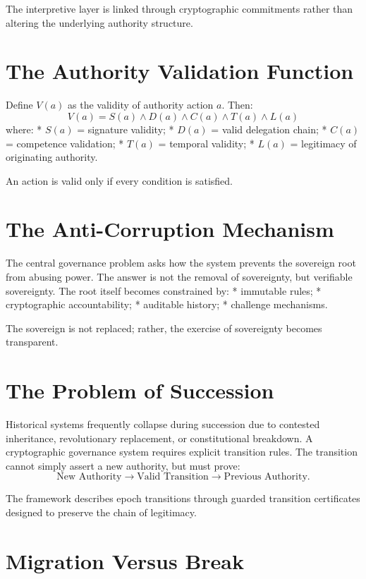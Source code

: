 \documentclass[11pt,openany]{book}
\theoremstyle{plain}
\theoremstyle{definition}
\begin{document}
The interpretive layer is linked through cryptographic commitments rather than altering the underlying authority structure.

\section*{The Authority Validation Function}

Define \(V(a)\) as the validity of authority action \(a\). Then:
\[
V(a) = S(a) \land D(a) \land C(a) \land T(a) \land L(a)
\]
where:
* \(S(a)\) = signature validity;
* \(D(a)\) = valid delegation chain;
* \(C(a)\) = competence validation;
* \(T(a)\) = temporal validity;
* \(L(a)\) = legitimacy of originating authority.

An action is valid only if every condition is satisfied.

\section*{The Anti-Corruption Mechanism}

The central governance problem asks how the system prevents the sovereign root from abusing power. The answer is not the removal of sovereignty, but verifiable sovereignty. The root itself becomes constrained by:
* immutable rules;
* cryptographic accountability;
* auditable history;
* challenge mechanisms.

The sovereign is not replaced; rather, the exercise of sovereignty becomes transparent.

\section*{The Problem of Succession}

Historical systems frequently collapse during succession due to contested inheritance, revolutionary replacement, or constitutional breakdown. A cryptographic governance system requires explicit transition rules. The transition cannot simply assert a new authority, but must prove:
\[
\text{New Authority} \longrightarrow \text{Valid Transition} \longrightarrow \text{Previous Authority}.
\]

The framework describes epoch transitions through guarded transition certificates designed to preserve the chain of legitimacy.

\section*{Migration Versus Break}
\end{document}
